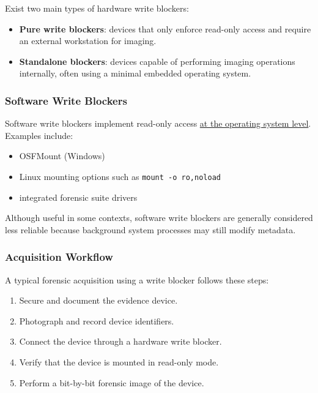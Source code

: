 \noindent
Exist two main types of hardware write blockers:

\begin{itemize}
\item \textbf{Pure write blockers}: devices that only enforce read-only access and require an external workstation for imaging.
\item \textbf{Standalone blockers}: devices capable of performing imaging operations internally, often using a minimal embedded operating system.
\end{itemize}

\subsubsection{Software Write Blockers}

Software write blockers implement read-only access \underline{at the operating system level}.\\
Examples include:

\begin{itemize}
\item OSFMount (Windows)
\item Linux mounting options such as \texttt{mount -o ro,noload}
\item integrated forensic suite drivers
\end{itemize}

\noindent
Although useful in some contexts, software write blockers are generally considered less reliable because background system processes may still modify metadata.

\vspace{1 cm}

\subsubsection{Acquisition Workflow}

A typical forensic acquisition using a write blocker follows these steps:

\begin{enumerate}
\item Secure and document the evidence device.
\item Photograph and record device identifiers.
\item Connect the device through a hardware write blocker.
\item Verify that the device is mounted in read-only mode.
\item Perform a bit-by-bit forensic image of the device.
\end{enumerate}

